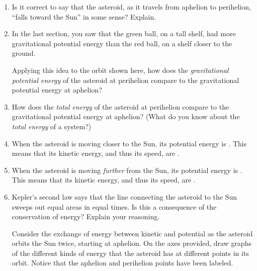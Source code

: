 \documentclass[12pt]{article}
\begin{document}
\begin{enumerate}

\item Is it correct to say that the asteroid, as it travels from aphelion to
perihelion, ``falls toward the Sun'' in some sense? Explain.

\vspace{1in}

\item In the last section, you saw that the green ball, on a tall shelf, had more gravitational potential
energy than the red ball, on a shelf closer to the ground.

Applying this idea to the orbit shown here, how does the {\it gravitational potential energy} of the asteroid
at perihelion compare to the gravitational potential energy at aphelion?

\vspace{1in}

\item How does the {\it total energy} of the asteroid
at perihelion compare to the gravitational potential energy at aphelion? (What do you know about the {\it total energy} of a system?)

\vspace{1in}

\item When the asteroid is moving closer to the Sun, its potential energy is \underline{\hspace{1in}}.
This means that its kinetic energy, and thus its speed, are \underline{\hspace{1in}}.

\item When the asteroid is moving {\it further} from the Sun, its potential energy is \underline{\hspace{1in}}.
This means that its kinetic energy, and thus its speed, are \underline{\hspace{1in}}.

\vspace{0.5in}

\item Kepler's second law says that the line connecting the asteroid to the Sun sweeps out equal areas in equal 
times. Is this a consequence of the conservation of energy? Explain your reasoning.

\newpage

Consider the exchange of energy between kinetic and potential as the asteroid orbits
the Sun twice, starting at aphelion. On the axes provided, draw graphs of the
different kinds of energy that the asteroid has at different points in its orbit.
Notice that the aphelion and perihelion points have been labeled.
\begin{center}


\end{center}
\end{enumerate}
\end{document}
